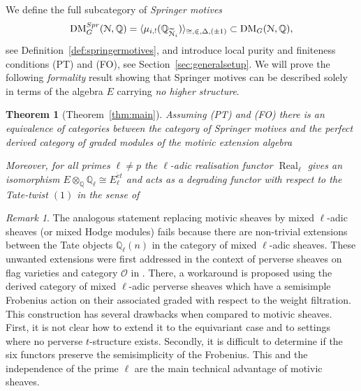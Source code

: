 \documentclass{amsart}
\theoremstyle{plain}
\newtheorem*{theorem*}{Theorem}
\theoremstyle{TheoremNum}
\theoremstyle{definition}
\theoremstyle{remark}
\newtheorem{remark}[theorem]{Remark}
\numberwithin{equation}{section}
\newcommand{\Q}{\mathbb{Q}}
\newcommand{\Z}{\mathbb{Z}}
\newcommand{\M}{\widetilde{\mathcal{N}}}
\newcommand{\N}{\mathcal{N}}
\newcommand{\D}{\operatorname{D}}
\newcommand{\DM}{\operatorname{DM}}
\newcommand{\DperfZ}{\operatorname{D}^\Z_{\operatorname{perf}}}
\newcommand{\Real}{\operatorname{Real}}
\begin{document}
We define the full subcategory of \emph{Springer motives}
$$\DM^{Spr}_G(\N,\Q)=\langle\mu_{i,!}(\Q_{\M_i})\rangle_{\cong,\inplus,\Delta,(\pm1)}\subset \DM_G(\N,\Q),$$
see Definition~\ref{def:springermotives}, and introduce local purity and finiteness conditions (PT) and (FO), see Section~\ref{sec:generalsetup}. We will prove the following \emph{formality} result showing that Springer motives can be described solely in terms of the algebra $E$ carrying \emph{no higher structure}.
\begin{theorem*}[Theorem~\ref{thm:main}]
Assuming (PT) and (FO) there is an equivalence of categories between the category of Springer motives and the perfect derived category of graded modules of the motivic extension algebra
\begin{center}
\end{center}
Moreover, for all primes $\ell\neq p$ the $\ell$-adic realisation functor $\Real_\ell$ gives an isomorphism $E\otimes_\Q\Q_\ell\cong E^{\acute{e}t}_\ell$ and acts as a degrading functor with respect to the Tate-twist $(1)$ in the sense of \cite{beilinson_koszul_1996}
\begin{center}
\end{center}
\end{theorem*}
\begin{remark}
The analogous statement replacing motivic sheaves by mixed $\ell$-adic sheaves (or mixed Hodge modules) fails because there are non-trivial extensions between the Tate objects $\Q_\ell(n)$ in the category of mixed $\ell$-adic sheaves. These unwanted extensions were first addressed in the context of perverse sheaves on flag varieties and category $\mathcal{O}$ in \cite[Section 4]{beilinson_koszul_1996}. There, a workaround is proposed using the derived category of mixed $\ell$-adic perverse sheaves which have a semisimple Frobenius action on their associated graded with respect to the weight filtration. This construction has several drawbacks when compared to motivic sheaves. First, it is not clear how to extend it to the equivariant case and to settings where no perverse $t$-structure exists. Secondly, it is difficult to determine if the six functors preserve the semisimplicity of the Frobenius. This and the independence of the prime $\ell$ are the main technical advantage of motivic sheaves.
\end{remark}
\end{document}
